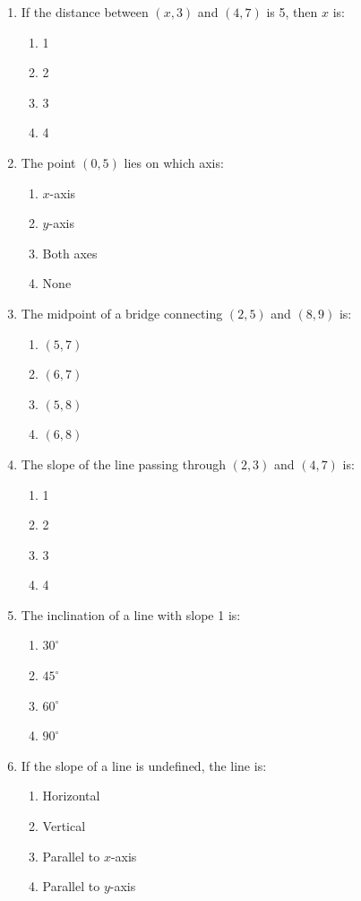\documentclass[11pt]{article}
\begin{document}
\begin{enumerate}[label=\textbf{\arabic*.}, start=204, leftmargin=2em]
\item If the distance between $(x, 3)$ and $(4, 7)$ is 5, then $x$ is:
\begin{enumerate}[label=(\Alph*)] \item 1 \item 2 \item 3 \item 4 \end{enumerate}

\item The point $(0, 5)$ lies on which axis:
\begin{enumerate}[label=(\Alph*)] \item $x$-axis \item $y$-axis \item Both axes \item None \end{enumerate}

\item The midpoint of a bridge connecting $(2, 5)$ and $(8, 9)$ is:
\begin{enumerate}[label=(\Alph*)] \item $(5, 7)$ \item $(6, 7)$ \item $(5, 8)$ \item $(6, 8)$ \end{enumerate}

\item The slope of the line passing through $(2, 3)$ and $(4, 7)$ is:
\begin{enumerate}[label=(\Alph*)] \item 1 \item 2 \item 3 \item 4 \end{enumerate}

\item The inclination of a line with slope 1 is:
\begin{enumerate}[label=(\Alph*)] \item $30^\circ$ \item $45^\circ$ \item $60^\circ$ \item $90^\circ$ \end{enumerate}

\item If the slope of a line is undefined, the line is:
\begin{enumerate}[label=(\Alph*)] \item Horizontal \item Vertical \item Parallel to $x$-axis \item Parallel to $y$-axis \end{enumerate}


\end{enumerate}
\end{document}
